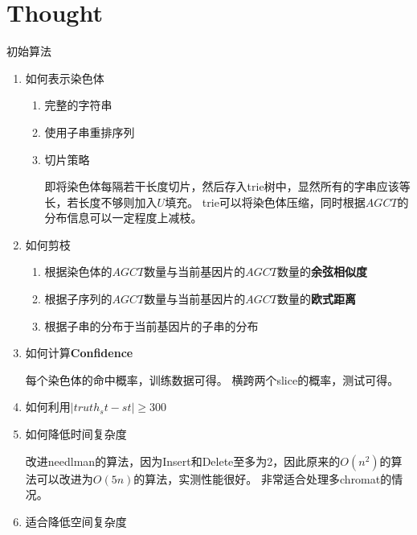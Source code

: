 \documentclass[hyperref,UTF8]{ctexart}
\theoremstyle{definition}
\theoremstyle{remark}
\numberwithin{equation}{subsection}
\newcommand{\Emph}{\textbf}
\begin{document}
\section{Thought}
\label{sec:thought}
	
	初始算法
	\begin{enumerate}
	
		\item 如何表示染色体
		
		\begin{enumerate}[(1)]
		
			\item 完整的字符串
			
			\item 使用子串重排序列

			\item 切片策略
			
			即将染色体每隔若干长度切片，然后存入trie树中，显然所有的字串应该等长，若长度不够则加入$U$填充。
			trie可以将染色体压缩，同时根据$AGCT$的分布信息可以一定程度上减枝。
			
		\end{enumerate}

		\item 如何剪枝
		
		\begin{enumerate}[(1)]
		
			\item 根据染色体的$AGCT$数量与当前基因片的$AGCT$数量的\Emph{余弦相似度}
			
			\item 根据子序列的$AGCT$数量与当前基因片的$AGCT$数量的\Emph{欧式距离}
			
			\item 根据子串的分布于当前基因片的子串的分布
		
		\end{enumerate}
		
		\item 如何计算\Emph{Confidence}

		每个染色体的命中概率，训练数据可得。
		横跨两个slice的概率，测试可得。
		
		\item 如何利用$|truth_st-st| \ge 300$
		
		\item 如何降低时间复杂度

		改进needlman的算法，因为Insert和Delete至多为2，因此原来的$O(n^2)$的算法可以改进为$O(5n)$的算法，实测性能很好。
		非常适合处理多chromat的情况。

		\item 适合降低空间复杂度


\end{enumerate}
\end{document}
